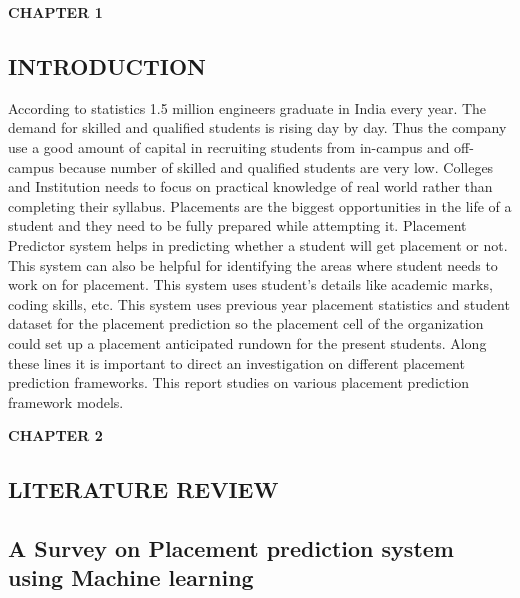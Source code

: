 \documentclass[12pt]{article}
\begin{document}
\newpage

\pagestyle{fancy}
\fancyhf{}
\fancyfoot[CE,CO]{\thepage}

\renewcommand{\headrulewidth}{0pt}
\begin{flushleft}\textbf{CHAPTER 1}\end{flushleft}
\begin{flushleft}\section{INTRODUCTION} \end{flushleft}
According to statistics 1.5 million engineers graduate in India every year. The demand for skilled and qualified 
students is rising day by day. Thus the company use a good 
amount of capital in recruiting students from in-campus and 
off-campus because number of skilled and qualified students 
are very low. Colleges and Institution needs to focus on 
practical knowledge of real world rather than completing their 
syllabus. Placements are the biggest opportunities in the life of 
a student and they need to be fully prepared while attempting 
it. 
Placement Predictor system helps in predicting whether a 
student will get placement or not. This system can also be 
helpful for identifying the areas where student needs to work 
on for placement. This system uses student’s details like 
academic marks, coding skills, etc. This system uses previous 
year placement statistics and student dataset for the placement 
prediction so the placement cell of the organization could set 
up a placement anticipated rundown for the present students.
Along these lines it is important to direct an investigation 
on different placement prediction frameworks. This report 
studies on various placement prediction 
framework models.
\newpage


\begin{flushleft}\textbf{CHAPTER 2}\end{flushleft}
\begin{flushleft}\section{LITERATURE REVIEW}\end{flushleft}
\vspace*{10px}
\subsection{A Survey on Placement prediction system using Machine learning}
\end{document}
